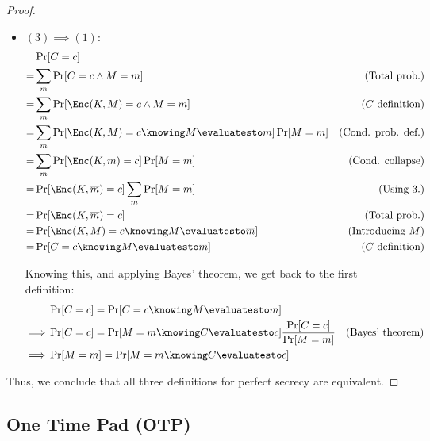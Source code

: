 \begin{proof}
\begin{itemize}
        \item $(3) \implies (1)$:
        \begin{align*}
            & \Pr[C = c] & \\
            =& \sum_{m}\Pr[C = c \wedge M = m]                                  & \text{(Total prob.)} \\
            =& \sum_{m}\Pr[\Enc(K, M) = c \wedge M = m]                         & \text{($C$ definition)} \\
            =& \sum_{m}\Pr[\Enc(K, M) = c \knowing M \evaluatesto m] \Pr[M = m] & \text{(Cond. prob. def.)} \\
            =& \sum_{m}\Pr[\Enc(K, m) = c] \Pr[M = m]                           & \text{(Cond. collapse)} \\
            =& \Pr[\Enc(K, \overline{m}) = c] \sum_{m} \Pr[M = m]               & \text{(Using 3.)} \\ %
            =& \Pr[\Enc(K, \overline{m}) = c]                                   & \text{(Total prob.)} \\
            =& \Pr[\Enc(K, M) = c \knowing M \evaluatesto \overline{m}]         & \text{(Introducing $M$)} \\
            =& \Pr[C = c \knowing M \evaluatesto \overline{m}]                  & \text{($C$ definition)} \\
        \end{align*}

        Knowing this, and applying Bayes' theorem, we get back to the first definition:
        \begin{align*}
            & \Pr[C = c] = \Pr[C = c \knowing M \evaluatesto m]                                         & \\
            \implies& \Pr[C = c] = \Pr[M = m \knowing C \evaluatesto c] \frac{\Pr[C = c]}{\Pr[M = m]}   & \text{(Bayes' theorem)} \\
            \implies& \Pr[M = m] = \Pr[M = m \knowing C \evaluatesto c]                                 & \\
        \end{align*}

    \end{itemize}

    Thus, we conclude that all three definitions for perfect secrecy are equivalent.

\end{proof}

\subsection{One Time Pad (OTP)}

